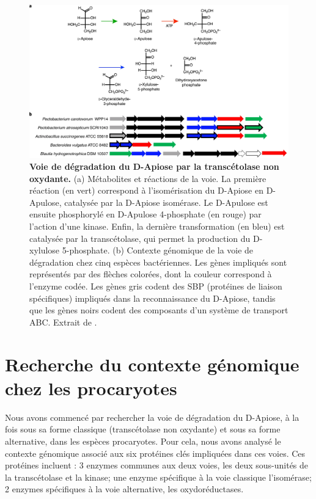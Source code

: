 \begin{figure}[htbp]
    \centering
    \includegraphics[width=0.75\linewidth]{images/ApiosePathway.png}
    \caption[Voie de dégradation du D-Apiose par la transcétolase non oxydante]{\textbf{Voie de dégradation du D-Apiose par la transcétolase non oxydante.} (a) Métabolites et réactions de la voie. La première réaction (en vert) correspond à l'isomérisation du D-Apiose en D-Apulose, catalysée par la D-Apiose isomérase. Le D-Apulose est ensuite phosphorylé en D-Apulose 4-phosphate (en rouge) par l’action d’une kinase. Enfin, la dernière transformation (en bleu) est catalysée par la transcétolase, qui permet la production du D-xylulose 5-phosphate. (b) Contexte génomique de la voie de dégradation chez cinq espèces bactériennes. Les gènes impliqués sont représentés par des flèches colorées, dont la couleur correspond à l’enzyme codée. Les gènes gris codent des SBP (protéines de liaison spécifiques) impliqués dans la reconnaissance du D-Apiose, tandis que les gènes noirs codent des composants d’un système de transport ABC. Extrait de \cite{carter_functional_2018}.}
    \label{fig:apiosePathway}
\end{figure}

\section{Recherche du contexte génomique chez les procaryotes}

Nous avons commencé par rechercher la voie de dégradation du D-Apiose, à la fois sous sa forme classique (transcétolase non oxydante) et sous sa forme alternative, dans les espèces procaryotes. Pour cela, nous avons analysé le contexte génomique associé aux six protéines clés impliquées dans ces voies. Ces protéines incluent : 3 enzymes communes aux deux voies, les deux sous-unités de la transcétolase et la kinase; une enzyme spécifique à la voie classique l'isomérase; 2 enzymes spécifiques à la voie alternative, les oxydoréductases.

